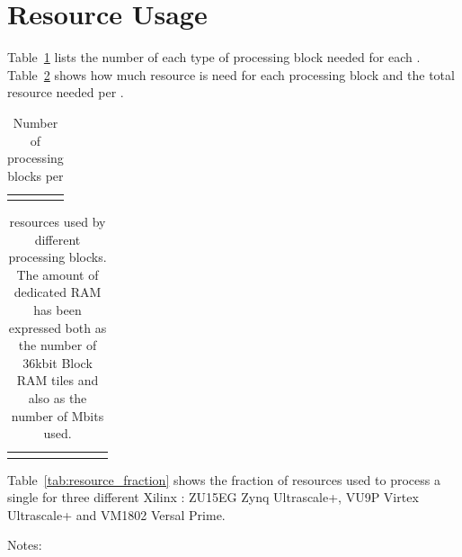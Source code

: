\documentclass{article}
\begin{document}
\section{Resource Usage}

Table~\ref{tab:block_numbers} lists the number of each type of processing block needed for each . Table~\ref{tab:block_resource_usage} shows how much  resource is need for each processing block and the total resource needed per .

\begin{table}[ht]
\begin{tabular}{l l}
\end{tabular}
\caption{Number of processing blocks per }
\label{tab:block_numbers}
\end{table}

\begin{table}[ht]
\begin{tabular}{p{2.2cm}  |p{1.5cm}| p{1.3cm}| p{1.3cm} |p{1.3cm} |p{1.5cm} |p{1.3cm}| p{1.5cm}}
\end{tabular}
\caption{ resources used by different processing blocks. The amount of dedicated RAM has been expressed both as the number of 36kbit Block RAM tiles and also as the number of Mbits used.}
\label{tab:block_resource_usage}
\end{table}

Table~\ref{tab:resource_fraction} shows the fraction of resources used to process a single  for three different Xilinx : ZU15EG Zynq Ultrascale+, VU9P Virtex Ultrascale+ and VM1802 Versal Prime. 

Notes:
\end{document}
